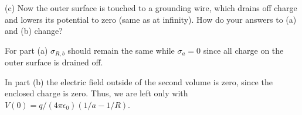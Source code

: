 \documentclass[12pt,a4paper]{article}
\begin{document}
(c) Now the outer surface is touched to a grounding wire, which drains off charge and lowers its potential to zero (same as at infinity). How do your answers to (a) and (b) change?

For part (a) $\sigma_{R,b}$ should remain the same while $\sigma_a = 0$ since all charge on the outer surface is drained off. 

In part (b) the electric field outside of the second volume is zero, since the enclosed charge is zero. Thus, we are left only with $V(0) = q/(4\pi\epsilon_0)(1/a-1/R)$.
\end{document}
